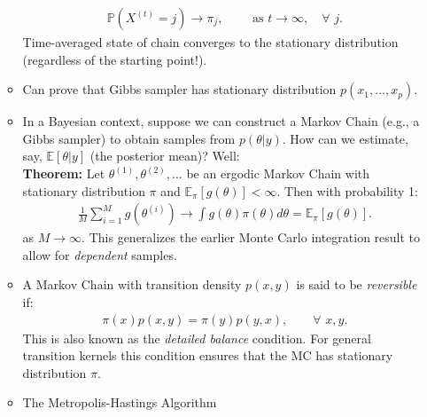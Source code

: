 \documentclass[11pt]{article}
\def\Pr{\mathbb{P}}
\begin{document}
\begin{itemize}
\begin{itemize}
\begin{align*}
    \Pr(X^{(t)}=j) \longrightarrow \pi_{j} , \qquad \textrm{ as } t \rightarrow \infty, \quad \forall{}\,\,  j .
    \end{align*}
    Time-averaged state of chain converges to the stationary distribution (regardless of the starting point!). 
    \item Can prove that Gibbs sampler has stationary distribution $p(x_{1},\ldots,x_{p})$. 
    \item In a Bayesian context, suppose we can construct a Markov Chain (e.g., a Gibbs sampler) to obtain samples from $p(\theta|y)$. How can we estimate, say, $\mathbb{E}\left[\theta|y\right]$ (the posterior mean)? Well:\\$ $\\
    \textbf{Theorem:}  Let $\theta^{(1)},\theta^{(2)},\ldots$ be an ergodic Markov Chain with stationary distribution $\pi$ and $\mathbb{E}_{\pi}\left[g(\theta)\right]<\infty$. Then with probability 1:
    \begin{align*}
    \frac{1}{M}\sum_{i=1}^{M}g(\theta^{(i)}) \rightarrow \int g(\theta)\pi(\theta)d\theta = \mathbb{E}_{\pi}\left[g(\theta)\right] .
    \end{align*}
    as $M\rightarrow\infty$. This generalizes the earlier Monte Carlo integration result to allow for \emph{dependent} samples.\\$ $\\
    \item A Markov Chain with transition density $p(x,y)$ is said to be \emph{reversible} if:
    \begin{align*}
    \pi(x)p(x,y) = \pi(y)p(y,x) , \qquad \forall\,\, x, y .
    \end{align*}
    This is also known as the \emph{detailed balance} condition. For general transition kernels this condition ensures that the MC has stationary distribution $\pi$. 
    \item The Metropolis-Hastings Algorithm
\end{itemize}

\end{itemize}
\end{document}
